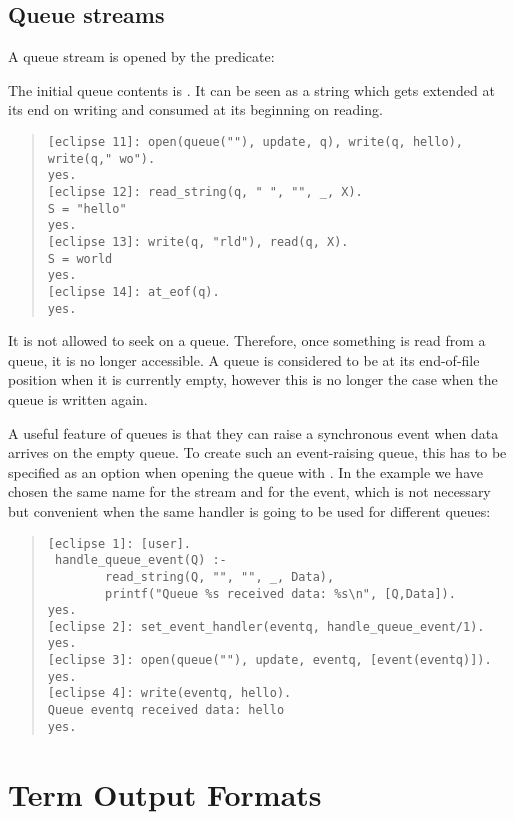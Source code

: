 \subsection{Queue streams}
\label{queueio}
A queue stream is opened by the
 predicate:
\begin{quote}
\end{quote}
The initial queue contents is .
It can be seen as a string which gets extended at its end on writing
and consumed at its beginning on reading.
\begin{quote}
\begin{verbatim}
[eclipse 11]: open(queue(""), update, q), write(q, hello), write(q," wo").
yes.
[eclipse 12]: read_string(q, " ", "", _, X).
S = "hello"
yes.
[eclipse 13]: write(q, "rld"), read(q, X).
S = world
yes.
[eclipse 14]: at_eof(q).
yes.
\end{verbatim}
\end{quote}
It is not allowed to seek on a queue. Therefore, once something is read
from a queue, it is no longer accessible. A queue is considered to be
at its end-of-file position when it is currently empty, however this
is no longer the case when the queue is written again.

A useful feature of queues is that they can raise a synchronous event
when data arrives on the empty queue. To create such an event-raising
queue, this has to be specified as an option when opening the queue with
.
In the example we have chosen the same name for the stream and for the
event, which is not necessary but convenient when the same handler
is going to be used for different queues:
\begin{quote}
\begin{verbatim}
[eclipse 1]: [user].
 handle_queue_event(Q) :-
        read_string(Q, "", "", _, Data),
        printf("Queue %s received data: %s\n", [Q,Data]).
yes.
[eclipse 2]: set_event_handler(eventq, handle_queue_event/1).
yes.
[eclipse 3]: open(queue(""), update, eventq, [event(eventq)]).
yes.
[eclipse 4]: write(eventq, hello).
Queue eventq received data: hello
yes.
\end{verbatim}
\end{quote}


\section{Term Output Formats}
\label{secoutputformats}

